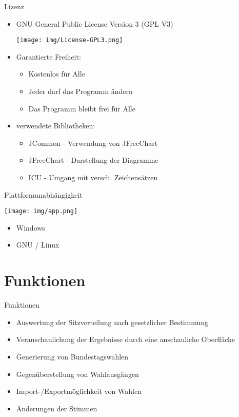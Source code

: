 \documentclass[18pt]{beamer}
\begin{document}
\begin{frame}{Lizenz}
\begin{itemize}
	\item GNU General Public License Version 3 (GPL V3)
	\begin{center}
		\texttt{[image: img/License-GPL3.png]}
	\end{center}
	\item Garantierte Freiheit:
	\begin{itemize}
		\item Kostenlos für Alle
		\item Jeder darf das Programm ändern
		\item Das Programm bleibt frei für Alle
	\end{itemize}

	\item verwendete Bibliotheken:
	\begin{itemize}
		\item JCommon - Verwendung von JFreeChart
		\item JFreeChart - Darstellung der Diagramme
		\item ICU - Umgang mit versch. Zeichensätzen
	\end{itemize}
\end{itemize}
\end{frame}

\begin{frame}{Plattformunabhängigkeit}
\begin{center}
	\texttt{[image: img/app.png]}
\end{center}
\begin{itemize}
	\item Windows
	\item GNU / Linux
\end{itemize}
\end{frame}

\section{Funktionen}
\begin{frame}{Funktionen}
\begin{itemize}
	\item Auswertung der Sitzverteilung nach gesetzlicher Bestimmung
	\item Veranschaulichung der Ergebnisse durch eine anschauliche Oberfläche
	\item Generierung von Bundestagswahlen
	\item Gegenüberstellung von Wahlausgängen
	\item Import-/Exportmöglichkeit von Wahlen
	\item Änderungen der Stimmen
\end{itemize}
\end{frame}
\end{document}

